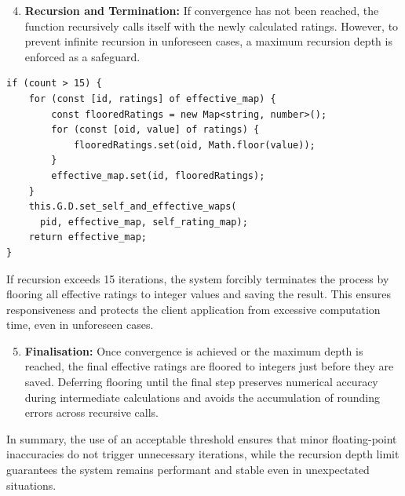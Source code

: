 \begin{enumerate}
    \setcounter{enumi}{3}
    \item \textbf{Recursion and Termination:} If convergence has not been reached, the function recursively calls itself with the newly calculated ratings. However, to prevent infinite recursion in unforeseen cases, a maximum recursion depth is enforced as a safeguard.
\end{enumerate}

\begin{verbatim}
if (count > 15) {
    for (const [id, ratings] of effective_map) {
        const flooredRatings = new Map<string, number>();
        for (const [oid, value] of ratings) {
            flooredRatings.set(oid, Math.floor(value));
        }
        effective_map.set(id, flooredRatings);
    }
    this.G.D.set_self_and_effective_waps(
      pid, effective_map, self_rating_map);
    return effective_map;
}
\end{verbatim}

If recursion exceeds 15 iterations, the system forcibly terminates the process by flooring all effective ratings to integer values and saving the result. This ensures responsiveness and protects the client application from excessive computation time, even in unforeseen cases.

\begin{enumerate}
    \setcounter{enumi}{4}
    \item \textbf{Finalisation:} Once convergence is achieved or the maximum depth is reached, the final effective ratings are floored to integers just before they are saved. Deferring flooring until the final step preserves numerical accuracy during intermediate calculations and avoids the accumulation of rounding errors across recursive calls.
\end{enumerate}

In summary, the use of an acceptable threshold ensures that minor floating-point inaccuracies do not trigger unnecessary iterations, while the recursion depth limit guarantees the system remains performant and stable even in unexpectated situations.




